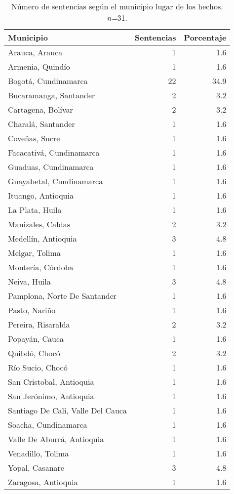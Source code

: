 \begin{table}[H]
\centering
\caption{Número de sentencias según el municipio lugar de los hechos. \textit{n=}31.} 
\label{tab:munhec}
\begin{tabular}{lrr}
  \hline
Municipio & Sentencias & Porcentaje \\ 
  \hline
Arauca, Arauca &  1 & 1.6 \\ 
  Armenia, Quindío &  1 & 1.6 \\ 
  Bogotá, Cundinamarca & 22 & 34.9 \\ 
  Bucaramanga, Santander &  2 & 3.2 \\ 
  Cartagena, Bolívar &  2 & 3.2 \\ 
  Charalá, Santander &  1 & 1.6 \\ 
  Coveñas, Sucre &  1 & 1.6 \\ 
  Facacativá, Cundinamarca &  1 & 1.6 \\ 
  Guaduas, Cundinamarca &  1 & 1.6 \\ 
  Guayabetal, Cundinamarca &  1 & 1.6 \\ 
  Ituango, Antioquia &  1 & 1.6 \\ 
  La Plata, Huila &  1 & 1.6 \\ 
  Manizales, Caldas &  2 & 3.2 \\ 
  Medellín, Antioquia &  3 & 4.8 \\ 
  Melgar, Tolima &  1 & 1.6 \\ 
  Montería, Córdoba &  1 & 1.6 \\ 
  Neiva, Huila &  3 & 4.8 \\ 
  Pamplona, Norte De Santander &  1 & 1.6 \\ 
  Pasto, Nariño &  1 & 1.6 \\ 
  Pereira, Risaralda &  2 & 3.2 \\ 
  Popayán, Cauca &  1 & 1.6 \\ 
  Quibdó, Chocó &  2 & 3.2 \\ 
  Río Sucio, Chocó &  1 & 1.6 \\ 
  San Cristobal, Antioquia &  1 & 1.6 \\ 
  San Jerónimo, Antioquia &  1 & 1.6 \\ 
  Santiago De Cali, Valle Del Cauca &  1 & 1.6 \\ 
  Soacha, Cundinamarca &  1 & 1.6 \\ 
  Valle De Aburrá, Antioquia &  1 & 1.6 \\ 
  Venadillo, Tolima &  1 & 1.6 \\ 
  Yopal, Casanare &  3 & 4.8 \\ 
  Zaragosa, Antioquia &  1 & 1.6 \\ 
   \hline
\end{tabular}
\end{table}
